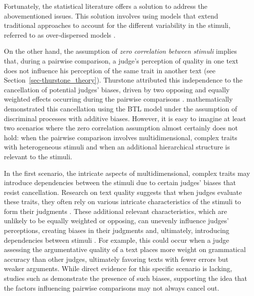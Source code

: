 \documentclass[
  authoryear,
  preprint,
  1p]{elsarticle}
\begin{document}
Fortunately, the statistical literature offers a solution to address the
abovementioned issues. This solution involves using models that extend
traditional approaches to account for the different variability in the
stimuli, referred to as over-dispersed models
\citep[chap.~12]{McElreath_2020}.

On the other hand, the assumption of \emph{zero correlation between
stimuli} implies that, during a pairwise comparison, a judge's
perception of quality in one text does not influence his perception of
the same trait in another text (see Section~\ref{sec-thurstone_theory}).
Thurstone attributed this independence to the cancellation of potential
judges' biases, driven by two opposing and equally weighted effects
occurring during the pairwise comparisons
\citep[pp.~268]{Thurstone_1927b}. \citet{Andrich_1978} mathematically
demonstrated this cancellation using the BTL model under the assumption
of discriminal processes with additive biases. However, it is easy to
imagine at least two scenarios where the zero correlation assumption
almost certainly does not hold: when the pairwise comparison involves
multidimensional, complex traits with heterogeneous stimuli and when an
additional hierarchical structure is relevant to the stimuli.

In the first scenario, the intricate aspects of multidimensional,
complex traits may introduce dependencies between the stimuli due to
certain judges' biases that resist cancellation. Research on text
quality suggests that when judges evaluate these traits, they often rely
on various intricate characteristics of the stimuli to form their
judgments
\citep{vanDaal_et_al_2016, Lesterhuis_2018, Chambers_et_al_2022}. These
additional relevant characteristics, which are unlikely to be equally
weighted or opposing, can unevenly influence judges' perceptions,
creating biases in their judgments and, ultimately, introducing
dependencies between stimuli
\citep[pp.~346]{vanderLinden_et_al_2017_II}. For example, this could
occur when a judge assessing the argumentative quality of a text places
more weight on grammatical accuracy than other judges, ultimately
favoring texts with fewer errors but weaker arguments. While direct
evidence for this specific scenario is lacking, studies such as
\citet{Pollitt_et_al_2003} demonstrate the presence of such biases,
supporting the idea that the factors influencing pairwise comparisons
may not always cancel out.
\end{document}
